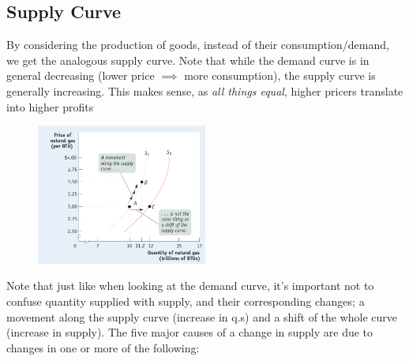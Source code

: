 \documentclass[english,course]{Notes}
\newcommand{\ita}[1]{\textit{#1}}
\begin{document}
	
		
\subsection{Supply Curve}


\par{By considering the production of goods, instead of their consumption/demand, we get the analogous supply curve. Note that while the demand curve is in general decreasing (lower price $\implies$ more consumption), the supply curve is generally increasing. This makes sense, as \ita{all things equal}, higher pricers translate into higher profits}






\begin{figure}[ht]
\centering
\includegraphics[width=0.5\textwidth]{supplyCurve}
\end{figure}

\par{Note that just like when looking at the demand curve, it's important not to confuse quantity supplied with supply, and their corresponding changes; a movement along the supply curve (increase in q.s) and a shift of the whole curve (increase in supply). The five major causes of a change in supply are due to changes in one or more of the following:}
\end{document}
